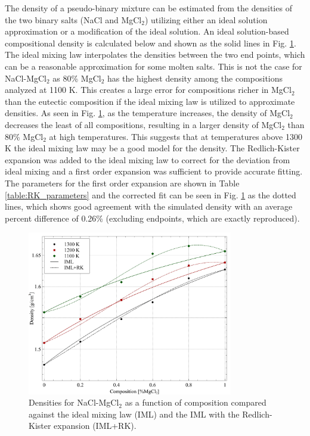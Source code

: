 \documentclass[review]{elsarticle}
\begin{document}
The density of a pseudo-binary mixture can be estimated from the densities of the two binary salts (NaCl and MgCl$_2$) utilizing either an ideal solution approximation or a modification of the ideal solution. An ideal solution-based compositional density is calculated below and shown as the solid lines in Fig. \ref{fig:density_mixing}. The ideal mixing law interpolates the densities between the two end points, which can be a reasonable approximation for some molten salts. This is not the case for NaCl-MgCl$_2$ as 80\% MgCl$_2$ has the highest density among the compositions analyzed at 1100 K. This creates a large error for compositions richer in MgCl$_2$ than the eutectic composition if the ideal mixing law is utilized to approximate densities. As seen in Fig. \ref{fig:density_mixing}, as the temperature increases, the density of MgCl$_2$ decreases the least of all compositions, resulting in a larger density of MgCl$_2$ than 80\% MgCl$_2$ at high temperatures. This suggests that at temperatures above 1300 K the ideal mixing law may be a good model for the density. The Redlich-Kister expansion was added to the ideal mixing law to correct for the deviation from ideal mixing and a first order expansion was sufficient to provide accurate fitting. The parameters for the first order expansion are shown in Table \ref{table:RK_parameters} and the corrected fit can be seen in Fig. \ref{fig:density_mixing} as the dotted lines, which shows good agreement with the simulated density with an average percent difference of 0.26\% (excluding endpoints, which are exactly reproduced). 

\begin{figure}[h]
 \centering
 \includegraphics[width=0.8\textwidth]{images/density_mixing.jpg} 
 \caption{Densities for NaCl-MgCl$_2$ as a function of composition compared against the ideal mixing law (IML) and the IML with the Redlich-Kister expansion (IML+RK).}
 \label{fig:density_mixing}
\end{figure} 
\end{document}
